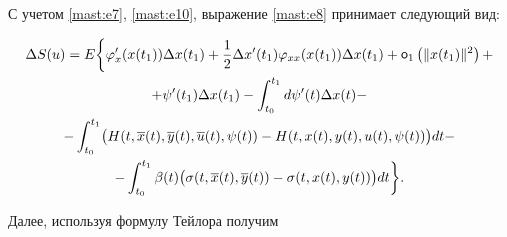 С учетом \eqref{mast:e7}, \eqref{mast:e10}, выражение \eqref{mast:e8} принимает следующий вид:

\begin{multline*}

\Delta S(u)=E \biggl\lbrace   \varphi'_{x}(x(t_{1})) \Delta x(t_{1})+\frac{1}{2} \Delta x'(t_{1}) \varphi_{xx}(x(t_{1})) \Delta x(t_{1})+\mathop{\sf o}\nolimits_{1} \left( \| x(t_{1}) \|^{2} \right)+

\\

+\psi'(t_{1}) \Delta x(t_{1})- \int^{t_{1}}_{t_{0}} d\psi'(t) \Delta x(t)-

\\-

 \int^{t_{1}}_{t_{0}} \bigl( H(t,\overline{x}(t),\overline{y}(t),\overline{u}(t),\psi (t))-H(t,x(t),y(t),u(t),\psi (t)) \bigr)dt-\\

- \int^{t_{1}}_{t_{0}}\beta (t)\bigl(  \sigma (t, \overline{x}(t), \overline{y}(t))-\sigma (t,x(t),y(t))  \bigr)  dt \biggr\rbrace .

\end{multline*}



Далее, используя формулу Тейлора  получим

